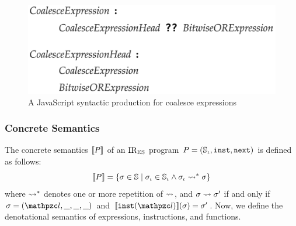 \begin{figure}
  \centering
  \includegraphics[width=.8\columnwidth]{img/coalesce-prod.png}
  \caption{A JavaScript syntactic production for coalesce expressions}
  \label{fig:coalesce-prod}
\end{figure}




\subsubsection{Concrete Semantics}

The concrete semantics $\llbracket{P}\rrbracket$ of an $\text{IR}_\text{ES}$ program $P = (\mathbb{S}_\iota,
\texttt{inst}, \texttt{next})$ is defined as follows:
\[
  \llbracket{P}\rrbracket = \{ \sigma \in \mathbb{S} \mid \sigma_\iota \in \mathbb{S}_\iota \wedge \sigma_\iota \leadsto^* \sigma \}
\]
where $\leadsto^*$ denotes one or more repetition of $\leadsto$, and $\sigma \leadsto
\sigma'$ if and only if $\st = (\lab, \_, \_, \_)$ and $\sem{\getinst(\lab)}(\st) =
\st'$. Now, we define the denotational semantics of expressions, instructions,
and functions.


